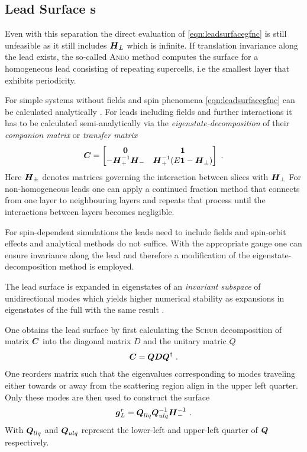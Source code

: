 \subsection{Lead Surface \cgfnc s}
Even with this separation the direct evaluation of \cref{eqn:leadsurfacegfnc} is still unfeasible as it still includes $\boldsymbol{H}_L$ which is infinite.
If translation invariance along the lead exists, the so-called \textsc{Ando} method \cite{PhysRevB.44.8017} computes the surface \gfnc{} for a homogeneous lead consisting of repeating supercells, i.e the smallest layer that exhibits periodicity.\par
For simple systems without fields and spin phenomena \cref{eqn:leadsurfacegfnc} can be calculated analytically \cite{Datta1997}. For leads including fields and further interactions it has to be calculated semi-analytically via the \emph{eigenstate-decomposition} of their \emph{companion matrix} \cite{PhysRevB.25.3975} or \emph{transfer matrix} \cite{PhysRevB.55.5266} \cite{PhysRevB.66.205319}
\begin{align}
  \boldsymbol{C} =
  \begin{bmatrix}
  \boldsymbol{0}  &\boldsymbol{1} \\
  -\boldsymbol{H}_{+}^{-1}\boldsymbol{H}_{-} &\boldsymbol{H}_{+}^{-1} (E\boldsymbol{1} - \boldsymbol{H}_{\perp})
  \end{bmatrix}\ .
  \label{eqn:companionmatrix}
\end{align}
Here $\boldsymbol{H}_{\pm}$ denotes matrices governing the interaction between slices with \hamil{} $\boldsymbol{H}_{\perp}$
For non-homogeneous leads one can apply a continued fraction method \cite{Velev2004} that connects \gfnc{} from one layer to neighbouring layers and repeats that process until the interactions between layers becomes negligible.\par
For spin-dependent simulations the leads need to include fields and spin-orbit effects and analytical methods do not suffice. With the appropriate gauge one can ensure invariance along the lead and therefore a modification of the eigenstate-decomposition method is employed.\par
The lead surface \gfnc{} is expanded in eigenstates of an \emph{invariant subspace} of unidirectional modes which yields higher numerical stability as expansions in eigenstates of the full \hamil{} with the same result \cite{Wimmer2009JComPhys}.\par
One obtains the lead surface \gfnc{} by first calculating the \textsc{Schur} decomposition of matrix $\boldsymbol{C}$ into the diagonal matrix $D$ and the unitary matric $Q$
\begin{align}
\boldsymbol{C} = \boldsymbol{Q}\boldsymbol{D}\boldsymbol{Q}^{\dagger}\ .
\label{eqn:schurdecomposition}
\end{align}
One reorders matrix  such that the eigenvalues corresponding to modes traveling either towards or away from the scattering region align in the upper left quarter. Only these modes are then used to construct the surface \gfnc{}
\begin{align}
\boldsymbol{g}^r_L = \boldsymbol{Q}_{llq}\boldsymbol{Q}_{ulq}^{-1}\boldsymbol{H}_{-}^{-1}\ .
\end{align}
With $\boldsymbol{Q}_{llq}$ and $\boldsymbol{Q}_{ulq}$ represent the lower-left and upper-left quarter of $\boldsymbol{Q}$ respectively. 
